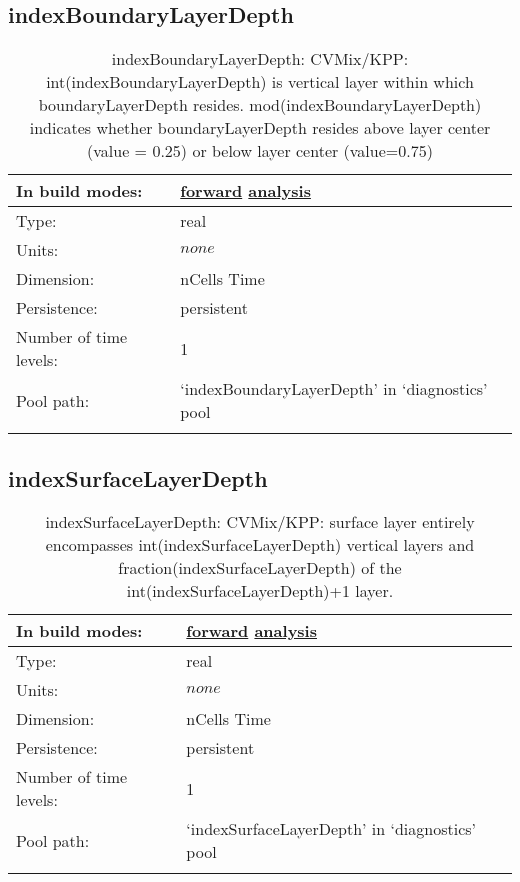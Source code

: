 \subsection[indexBoundaryLayerDepth]{indexBoundaryLayerDepth}
\label{subsec:var_sec_diagnostics_indexBoundaryLayerDepth}
\begin{center}
\begin{longtable}{| p{2.0in} | p{4.0in} |}
        \hline 
        In build modes: & \hyperref[subsec:forward_var_tab_diagnostics]{forward} \hyperref[subsec:analysis_var_tab_diagnostics]{analysis} \\
        \hline 
        Type: & real \\
        \hline 
        Units: & $none$ \\
        \hline 
        Dimension: & nCells Time \\
        \hline 
        Persistence: & persistent \\
        \hline 
        Number of time levels: & 1 \\
        \hline 
            Pool path: & `indexBoundaryLayerDepth' in `diagnostics' pool \\
		 \hline 
    \caption{indexBoundaryLayerDepth: CVMix/KPP: int(indexBoundaryLayerDepth) is vertical layer within which boundaryLayerDepth resides. mod(indexBoundaryLayerDepth) indicates whether boundaryLayerDepth resides above layer center (value = 0.25) or below layer center (value=0.75)}
\end{longtable}
\end{center}
\subsection[indexSurfaceLayerDepth]{indexSurfaceLayerDepth}
\label{subsec:var_sec_diagnostics_indexSurfaceLayerDepth}
\begin{center}
\begin{longtable}{| p{2.0in} | p{4.0in} |}
        \hline 
        In build modes: & \hyperref[subsec:forward_var_tab_diagnostics]{forward} \hyperref[subsec:analysis_var_tab_diagnostics]{analysis} \\
        \hline 
        Type: & real \\
        \hline 
        Units: & $none$ \\
        \hline 
        Dimension: & nCells Time \\
        \hline 
        Persistence: & persistent \\
        \hline 
        Number of time levels: & 1 \\
        \hline 
            Pool path: & `indexSurfaceLayerDepth' in `diagnostics' pool \\
		 \hline 
    \caption{indexSurfaceLayerDepth: CVMix/KPP: surface layer entirely encompasses int(indexSurfaceLayerDepth) vertical layers and fraction(indexSurfaceLayerDepth) of the int(indexSurfaceLayerDepth)+1 layer.}
\end{longtable}
\end{center}
